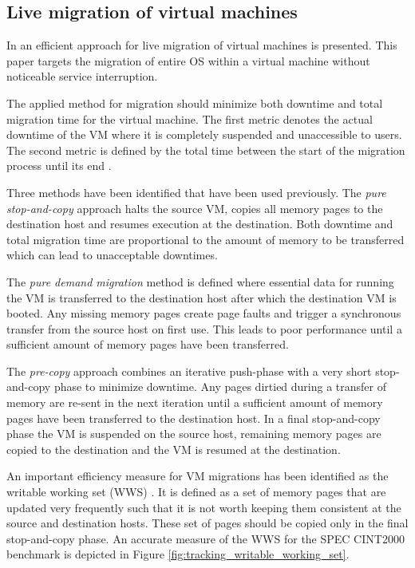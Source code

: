 \subsection{Live migration of virtual machines} \label{ssec:live_migration_of_virtual_machines}

In \cite{clark2005live} an efficient approach for live migration of virtual machines is presented. This paper targets the migration of entire OS within a virtual machine without noticeable service interruption. 

The applied method for migration should minimize both downtime and total migration time for the virtual machine. The first metric denotes the actual downtime of the VM where it is completely suspended and unaccessible to users. The second metric is defined by the total time between the start of the migration process until its end \cite{clark2005live}. 

Three methods have been identified that have been used previously. The \textit{pure stop-and-copy} approach halts the source VM, copies all memory pages to the destination host and resumes execution at the destination. Both downtime and total migration time are proportional to the amount of memory to be transferred which can lead to unacceptable downtimes. 

The \textit{pure demand migration} method is defined where essential data for running the VM is transferred to the destination host after which the destination VM is booted. Any missing memory pages create page faults and trigger a synchronous transfer from the source host on first use. This leads to poor performance until a sufficient amount of memory pages have been transferred. 

The \textit{pre-copy} approach combines an iterative push-phase with a very short stop-and-copy phase to minimize downtime. Any pages dirtied during a transfer of memory are re-sent in the next iteration until a sufficient amount of memory pages have been transferred to the destination host. In a final stop-and-copy phase the VM is suspended on the source host, remaining memory pages are copied to the destination and the VM is resumed at the destination. 

An important efficiency measure for VM migrations has been identified as the writable working set (WWS) \cite{clark2005live}. It is defined as a set of memory pages that are updated very frequently such that it is not worth keeping them consistent at the source and destination hosts. These set of pages should be copied only in the final stop-and-copy phase. An accurate measure of the WWS for the SPEC CINT2000 benchmark is depicted in Figure \ref{fig:tracking_writable_working_set}. 


